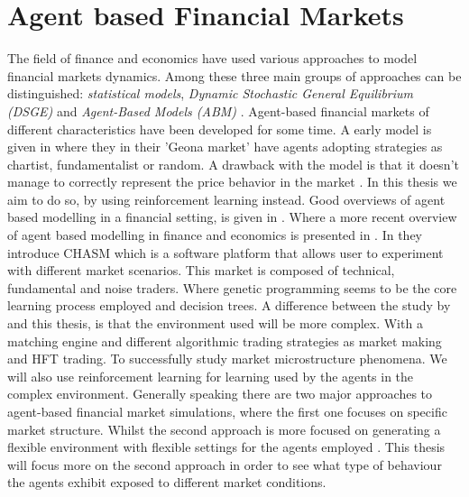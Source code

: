 \documentclass{kththesis}
\theoremstyle{definition}
\begin{document}
\section{Agent based Financial Markets}
The field of finance and economics have used various approaches to model financial markets dynamics. Among these three main groups of approaches can be distinguished: \textit{statistical models}, \textit{Dynamic Stochastic General Equilibrium (DSGE)} and \textit{Agent-Based Models (ABM)} \parencite{lussange2018bright}. Agent-based financial markets of different characteristics have been developed for some time. A early model is given in \parencite{raberto2001agent} where they in their 'Geona market' have agents adopting strategies as chartist, fundamentalist or random. A drawback with the model is that it doesn't manage to correctly represent the price behavior in the market \parencite{raberto2001agent}. In this thesis we aim to do so, by using reinforcement learning instead. 
\newline
\newline
Good overviews of agent based modelling in a financial setting, is given in \parencite{martinez2009evolutionary, boer2008agent, lebaron2006agent}. Where a more recent overview of agent based modelling in finance and economics is presented in \parencite{lussange2018bright}. In \textcite{martinez2009evolutionary} they introduce CHASM which is a software platform that allows user to experiment with different market scenarios. This market is composed of technical, fundamental and noise traders. 
\newpage
Where genetic programming seems to be the core learning process employed and decision trees. A difference between the study by \textcite{martinez2009evolutionary} and this thesis, is that the environment used will be more complex. With a matching engine and different algorithmic trading strategies as market making and HFT trading. To successfully study market microstructure phenomena. We will also use reinforcement learning for learning used by the agents in the complex environment. Generally speaking there are two major approaches to agent-based financial market simulations, where the first one focuses on specific market structure. Whilst the second approach is more focused on generating a flexible environment with flexible settings for the agents employed \parencite{brandouy2011design}. This thesis will focus more on the second approach in order to see what type of behaviour the agents exhibit exposed to different market conditions. 
\newline
\newline
\end{document}
